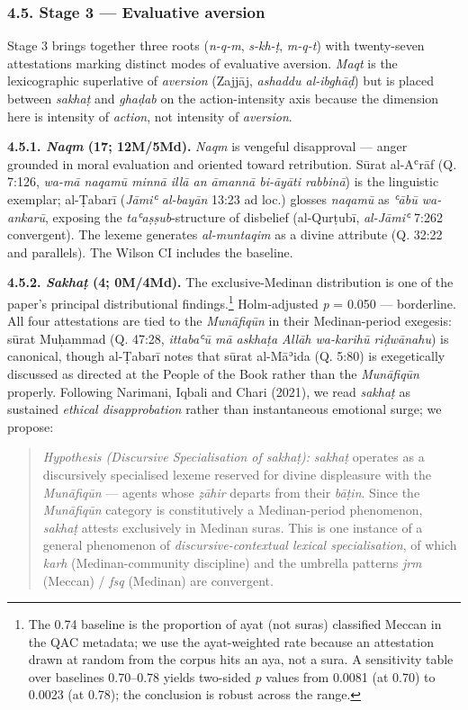 \documentclass[11pt,a4paper]{article}
\begin{document}
\subsubsection{4.5. Stage 3 --- Evaluative
aversion}\label{stage-3-evaluative-aversion}

Stage 3 brings together three roots (\emph{n-q-m}, \emph{s-kh-ṭ},
\emph{m-q-t}) with twenty-seven attestations marking distinct modes of
evaluative aversion. \emph{Maqt} is the lexicographic superlative of
\emph{aversion} (Zajjāj, \emph{ashaddu al-ibghāḍ}) but is placed between
\emph{sakhaṭ} and \emph{ghaḍab} on the action-intensity axis because the
dimension here is intensity of \emph{action}, not intensity of
\emph{aversion}.

\textbf{4.5.1. \emph{Naqm} (17; 12M/5Md).} \emph{Naqm} is vengeful
disapproval --- anger grounded in moral evaluation and oriented toward
retribution. Sūrat al-Aʿrāf (Q. 7:126, \emph{wa-mā naqamū minnā illā an
āmannā bi-āyāti rabbinā}) is the linguistic exemplar; al-Ṭabarī
(\emph{Jāmiʿ al-bayān} 13:23 ad loc.) glosses \emph{naqamū} as
\emph{ʿābū wa-ankarū}, exposing the \emph{taʿaṣṣub}-structure of
disbelief (al-Qurṭubī, \emph{al-Jāmiʿ} 7:262 convergent). The lexeme
generates \emph{al-muntaqim} as a divine attribute (Q. 32:22 and
parallels). The Wilson CI includes the baseline.

\textbf{4.5.2. \emph{Sakhaṭ} (4; 0M/4Md).} The exclusive-Medinan
distribution is one of the paper's principal distributional
findings.\footnote{The 0.74 baseline is the proportion of ayat (not
  suras) classified Meccan in the QAC metadata; we use the ayat-weighted
  rate because an attestation drawn at random from the corpus hits an
  aya, not a sura. A sensitivity table over baselines 0.70--0.78 yields
  two-sided \emph{p} values from 0.0081 (at 0.70) to 0.0023 (at 0.78);
  the conclusion is robust across the range.} Holm-adjusted \emph{p} =
0.050 --- borderline. All four attestations are tied to the
\emph{Munāfiqūn} in their Medinan-period exegesis: sūrat Muḥammad (Q.
47:28, \emph{ittabaʿū mā askhaṭa Allāh wa-karihū riḍwānahu}) is
canonical, though al-Ṭabarī notes that sūrat al-Māʾida (Q. 5:80) is
exegetically discussed as directed at the People of the Book rather than
the \emph{Munāfiqūn} properly. Following Narimani, Iqbali and Chari
(2021), we read \emph{sakhaṭ} as sustained \emph{ethical disapprobation}
rather than instantaneous emotional surge; we propose:

\begin{quote}
\emph{Hypothesis (Discursive Specialisation of sakhaṭ):} \emph{sakhaṭ}
operates as a discursively specialised lexeme reserved for divine
displeasure with the \emph{Munāfiqūn} --- agents whose \emph{ẓāhir}
departs from their \emph{bāṭin}. Since the \emph{Munāfiqūn} category is
constitutively a Medinan-period phenomenon, \emph{sakhaṭ} attests
exclusively in Medinan suras. This is one instance of a general
phenomenon of \emph{discursive-contextual lexical specialisation}, of
which \emph{karh} (Medinan-community discipline) and the umbrella
patterns \emph{jrm} (Meccan) / \emph{fsq} (Medinan) are convergent.
\end{quote}
\end{document}
